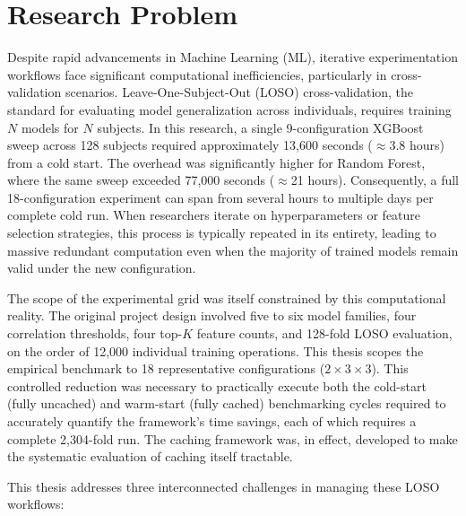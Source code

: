 \section{Research Problem}

Despite rapid advancements in Machine Learning (ML), iterative experimentation workflows face significant computational inefficiencies, particularly in cross-validation scenarios. Leave-One-Subject-Out (LOSO) cross-validation, the standard for evaluating model generalization across individuals, requires training $N$ models for $N$ subjects. In this research, a single 9-configuration XGBoost sweep across 128 subjects required approximately 13,600 seconds ($\approx$3.8 hours) from a cold start. The overhead was significantly higher for Random Forest, where the same sweep exceeded 77,000 seconds ($\approx$21 hours). Consequently, a full 18-configuration experiment can span from several hours to multiple days per complete cold run. When researchers iterate on hyperparameters or feature selection strategies, this process is typically repeated in its entirety, leading to massive redundant computation even when the majority of trained models remain valid under the new configuration.

The scope of the experimental grid was itself constrained by this computational reality. The original project design involved five to six model families, four correlation thresholds, four top-$K$ feature counts, and 128-fold LOSO evaluation, on the order of 12{,}000 individual training operations. This thesis scopes the empirical benchmark to 18 representative configurations ($2 \times 3 \times 3$). This controlled reduction was necessary to practically execute both the cold-start (fully uncached) and warm-start (fully cached) benchmarking cycles required to accurately quantify the framework's time savings, each of which requires a complete 2{,}304-fold run. The caching framework was, in effect, developed to make the systematic evaluation of caching itself tractable.

This thesis addresses three interconnected challenges in managing these LOSO workflows:

